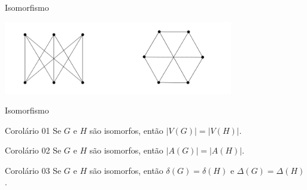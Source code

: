 \documentclass[xcolor=dvipsnames,table]{beamer}
\begin{document}
	\begin{frame}{Isomorfismo}
		\begin{center}
			\includegraphics[width=10cm]{images/isomorfismo03.png}
		\end{center}
	\end{frame}
	
	\begin{frame}{Isomorfismo}
		\begin{block}{Corolário 01}
			Se $G$ e $H$ são isomorfos, então $|V(G)| = |V(H)|$.
		\end{block}
		\pause
		\begin{block}{Corolário 02}
			Se $G$ e $H$ são isomorfos, então $|A(G)| = |A(H)|$.
		\end{block}
		\pause
		\begin{block}{Corolário 03}
			Se $G$ e $H$ são isomorfos, então $\delta(G) = \delta(H)$ e $\Delta(G) = \Delta(H)$.
		\end{block}
	\end{frame}
	
	\begin{frame}
		\titlepage
	\end{frame}
	
\end{document}
